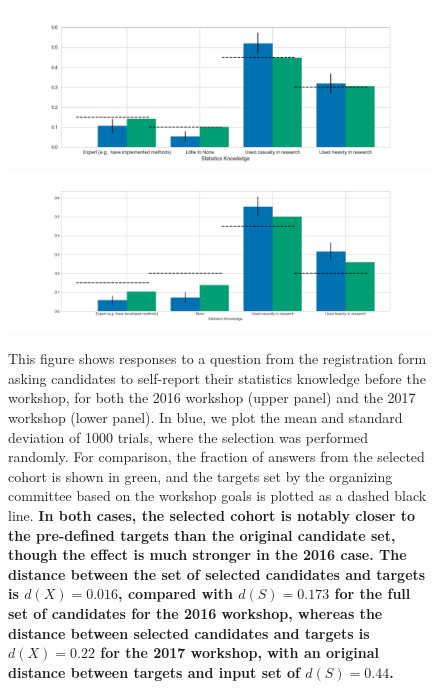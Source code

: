 \documentclass[12pt]{article}
\begin{document}
\begin{figure}[h!]
\begin{center}
\includegraphics[width=15cm]{stats_results2016.png}
\includegraphics[width=15cm]{stats_results2017.png}
\caption{This figure shows responses to a question from the registration form asking candidates to self-report their statistics knowledge before the workshop, for both the 2016 workshop (upper panel) and the 2017 workshop (lower panel). In blue, we plot the mean and standard deviation of 1000 trials, where the selection was performed randomly.%
For comparison, the fraction of answers from the selected cohort is shown in green, and the targets set by the organizing committee based on the workshop goals is plotted as a dashed black line.
\textbf{In both cases, the selected cohort is notably closer to the pre-defined targets than the original candidate set, though the effect is much stronger in the 2016 case.
The distance between the set of selected candidates and targets is $d(X)=0.016$, compared with $d(S)=0.173$ for the full set of candidates for the 2016 workshop, whereas the distance between selected candidates and targets is $d(X)=0.22$ for the 2017 workshop, with an original distance between targets and input set of $d(S)=0.44$.}}
\label{fig:entrofy_stats}
\end{center}
\end{figure}
\end{document}
